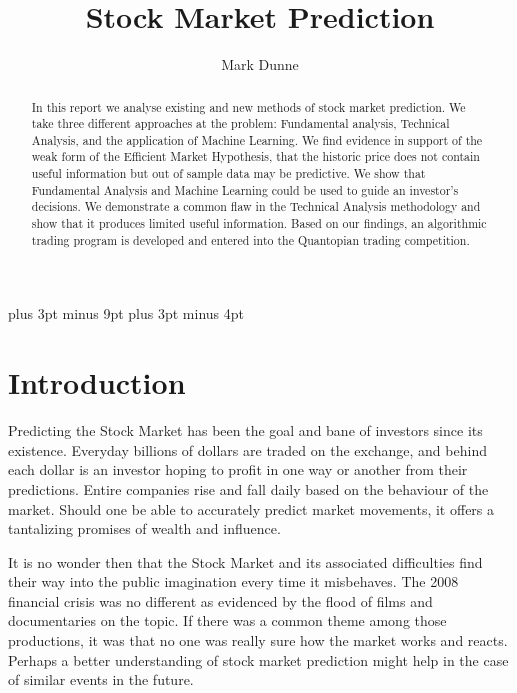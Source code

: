 \documentclass{report}
\title{Stock Market Prediction}
\author{Mark Dunne}
\begin{document}
\lstset{language=Python}    
\belowdisplayskip=12pt plus 3pt minus 9pt
\belowdisplayshortskip=7pt plus 3pt minus 4pt

\maketitle

\begin{abstract}

In this report we analyse existing and new methods of stock market prediction. We take three different approaches at the problem: Fundamental analysis, Technical Analysis, and the application of Machine Learning. We find evidence in support of the weak form of the Efficient Market Hypothesis, that the historic price does not contain useful information but out of sample data may be predictive. We show that Fundamental Analysis and Machine Learning could be used to guide an investor's decisions. We demonstrate a common flaw in the Technical Analysis methodology and show that it produces limited useful information. Based on our findings, an algorithmic trading program is developed and entered into the Quantopian trading competition.

\end{abstract}

\tableofcontents

\chapter{Introduction}

Predicting the Stock Market has been the goal and bane of investors since its existence. Everyday billions of dollars are traded on the exchange, and behind each dollar is an investor hoping to profit in one way or another from their predictions. Entire companies rise and fall daily based on the behaviour of the market. Should one be able to accurately predict market movements, it offers a tantalizing promises of wealth and influence. 

It is no wonder then that the Stock Market and its associated difficulties find their way into the public imagination every time it misbehaves. The 2008 financial crisis was no different as evidenced by the flood of films and documentaries on the topic. If there was a common theme among those productions, it was that no one was really sure how the market works and reacts. Perhaps a better understanding of stock market prediction might help in the case of similar events in the future.
\end{document}
